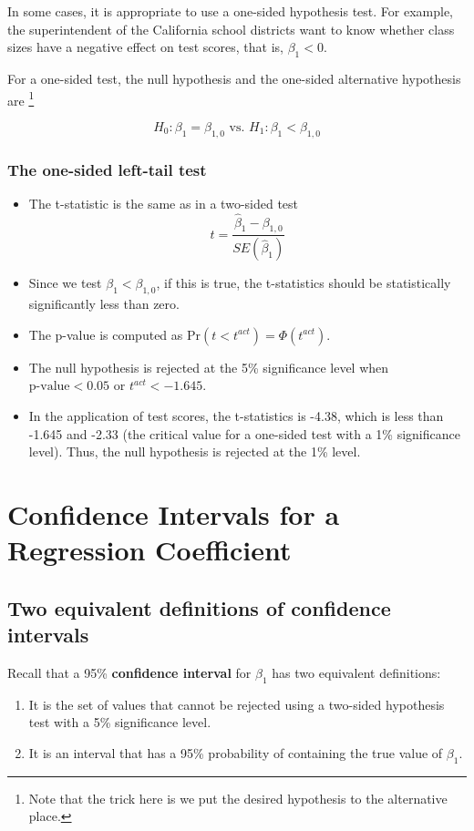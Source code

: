 \documentclass[a4paper,11pt]{article}
\newcommand{\pr}{\mathrm{Pr}}
\begin{document}
In some cases, it is appropriate to use a one-sided hypothesis
test. For example, the superintendent of the California school
districts want to know whether class sizes have a negative effect on
test scores, that is, \(\beta_1 < 0\). 

For a one-sided test, the null hypothesis and the one-sided
alternative hypothesis are \footnote{Note that the trick here is we put the
desired hypothesis to the alternative place.}

\[ H_0: \beta_1 = \beta_{1,0} \text{ vs. } H_1: \beta_1 < \beta_{1,0} \]

\subsubsection*{The one-sided left-tail test}
\label{sec:org95a40d9}

\begin{itemize}
\item The t-statistic is the same as in a two-sided test
\[ t = \frac{\hat{\beta}_1 - \beta_{1,0}}{SE(\hat{\beta}_1)} \]
\item Since we test \(\beta_1 < \beta_{1,0}\), if this is true, the
t-statistics should be statistically significantly less than zero.
\item The p-value is computed as \(\pr(t < t^{act}) = \varPhi(t^{act})\).
\item The null hypothesis is rejected at the 5\% significance level when
\(\text{p-value} < 0.05\) or \(t^{act} < -1.645\).
\item In the application of test scores, the t-statistics is -4.38, which
is less than -1.645 and -2.33 (the critical value for a one-sided
test with a 1\% significance level). Thus, the null hypothesis is
rejected at the 1\% level.
\end{itemize}


\section{Confidence Intervals for a Regression Coefficient}
\label{sec:orgeeb20eb}

\subsection{Two equivalent definitions of confidence intervals}
\label{sec:orgeae4861}

Recall that a 95\% \textbf{confidence interval} for \(\beta_1\) has two equivalent
definitions:
\begin{enumerate}
\item It is the set of values that cannot be rejected using a two-sided
hypothesis test with a 5\% significance level.
\item It is an interval that has a 95\% probability of containing the true
value of \(\beta_1\).
\end{enumerate}
\end{document}
